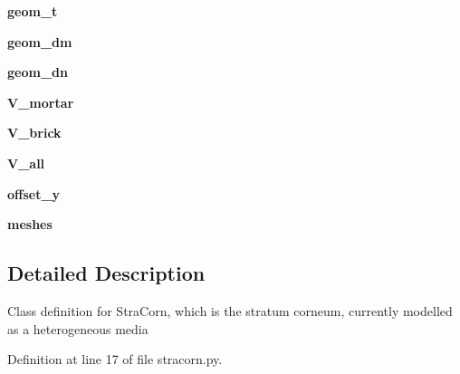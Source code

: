 \begin{DoxyCompactItemize}
\item 
{\bfseries geom\+\_\+t}\hypertarget{classstracorn_1_1StraCorn_a13a081cab2aab907a8fba74488300d51}{}\label{classstracorn_1_1StraCorn_a13a081cab2aab907a8fba74488300d51}

\item 
{\bfseries geom\+\_\+dm}\hypertarget{classstracorn_1_1StraCorn_ad83d1ead16e7d8e91100b6f18346b9b7}{}\label{classstracorn_1_1StraCorn_ad83d1ead16e7d8e91100b6f18346b9b7}

\item 
{\bfseries geom\+\_\+dn}\hypertarget{classstracorn_1_1StraCorn_a80e8498d06a7ba4635bacc779bff2cb7}{}\label{classstracorn_1_1StraCorn_a80e8498d06a7ba4635bacc779bff2cb7}

\item 
{\bfseries V\+\_\+mortar}\hypertarget{classstracorn_1_1StraCorn_af85e8a8c4aa005ce418c8164b946a0f5}{}\label{classstracorn_1_1StraCorn_af85e8a8c4aa005ce418c8164b946a0f5}

\item 
{\bfseries V\+\_\+brick}\hypertarget{classstracorn_1_1StraCorn_a5bd0c847e5df8c69a947ed17974cbe3b}{}\label{classstracorn_1_1StraCorn_a5bd0c847e5df8c69a947ed17974cbe3b}

\item 
{\bfseries V\+\_\+all}\hypertarget{classstracorn_1_1StraCorn_ab3dafca0074d669724f20a9c808e0c42}{}\label{classstracorn_1_1StraCorn_ab3dafca0074d669724f20a9c808e0c42}

\item 
{\bfseries offset\+\_\+y}\hypertarget{classstracorn_1_1StraCorn_a6d4f9e4e1897186d86883ab14de4f14c}{}\label{classstracorn_1_1StraCorn_a6d4f9e4e1897186d86883ab14de4f14c}

\item 
{\bfseries meshes}\hypertarget{classstracorn_1_1StraCorn_a298dfda5fde77d782c27f94ee5f4e1ed}{}\label{classstracorn_1_1StraCorn_a298dfda5fde77d782c27f94ee5f4e1ed}

\end{DoxyCompactItemize}


\subsection{Detailed Description}
\begin{DoxyVerb}Class definition for StraCorn, 
which is the stratum corneum, currently modelled as a heterogeneous media
\end{DoxyVerb}
 

Definition at line 17 of file stracorn.\+py.



